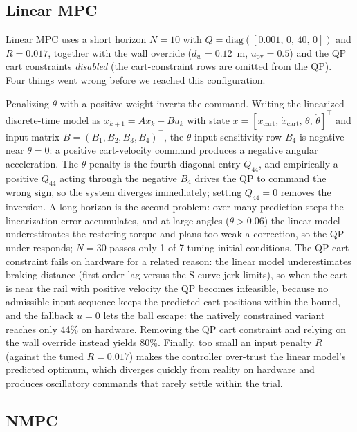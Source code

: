 \subsection{Linear MPC}

Linear MPC uses a short horizon $N=10$ with
$Q = \text{diag}([0.001,\, 0,\, 40,\, 0])$ and $R = 0.017$, together with the
wall override ($d_w=0.12$~m, $u_\text{ov}=0.5$) and the QP cart constraints
\emph{disabled} (the cart-constraint rows are omitted from the QP). Four
things went wrong before we reached this configuration.

Penalizing $\dot{\theta}$ with a positive weight inverts the command. Writing
the linearized discrete-time model as $x_{k+1}=A x_k + B u_k$ with state
$x=[x_\text{cart},\,\dot{x}_\text{cart},\,\theta,\,\dot{\theta}]^\top$ and
input matrix $B=(B_1,B_2,B_3,B_4)^\top$, the $\dot\theta$ input-sensitivity
row $B_4$ is negative near $\theta=0$: a positive cart-velocity command
produces a negative angular acceleration. The $\dot\theta$-penalty is the
fourth diagonal entry $Q_{44}$, and empirically a positive $Q_{44}$ acting
through the negative $B_4$ drives the QP to command the wrong sign, so the
system diverges immediately; setting $Q_{44}=0$ removes the inversion. A long
horizon is the second problem: over many prediction steps the linearization
error accumulates, and at large angles ($\theta > 0.06$)
the linear model underestimates the restoring torque and plans too weak a
correction, so the QP under-responds; $N=30$ passes only 1 of 7 tuning initial conditions.
The QP cart constraint fails on hardware for a related reason: the linear
model underestimates braking distance (first-order lag versus the S-curve jerk
limits), so when the cart is near the rail with positive velocity the QP
becomes infeasible, because no admissible input sequence keeps the predicted
cart positions within the bound, and the fallback $u=0$ lets the ball escape: the natively
constrained variant reaches only 44\% on hardware. Removing the QP cart
constraint and relying on the wall override instead yields 80\%.
Finally, too small an input penalty $R$ (against the tuned $R=0.017$) makes the
controller over-trust the linear model's predicted optimum, which diverges
quickly from reality on hardware and produces oscillatory commands that rarely
settle within the trial.

\subsection{NMPC}

